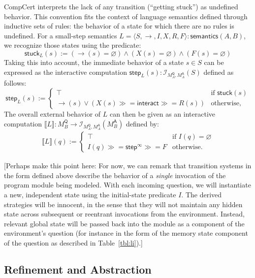 \documentclass{article}
\newcommand{\kw}[1]{\ensuremath{ \mathsf{#1} }}
\newcommand{\bind}{\gg\!\!=}
\begin{document}
CompCert interprets the lack of any transition (``getting stuck'')
as undefined behavior.
This convention fits the context of
language semantics defined through inductive sets of rules:
the behavior of a state for which there are no rules is undefined.
For a small-step semantics
$L = \langle S, {\rightarrow}, I, X, R, F \rangle : \kw{semantics}(A,B)$,
we recognize those states using the predicate:
\[
    \kw{stuck}_L(s) :=
      ({\rightarrow}(s) = \varnothing) \wedge
      (X(s) = \varnothing) \wedge
      (F(s) = \varnothing)
\]
Taking this into account,
the immediate behavior of a state $s \in S$
can be expressed as the interactive computation
$\kw{step}_L(s) : \mathcal{I}_{M_A^\kw{Q},M_A^\kw{A}}(S)$
defined as follows:
\[
  \kw{step}_L(s) :=
    \begin{cases}
      \top & \mbox{if } \kw{stuck}(s) \\
      {\rightarrow}(s) \vee
      (X(s) \bind \kw{interact} \bind R(s)) & \mbox{otherwise,}
   \end{cases}
\]
The overall external behavior of $L$
can then be given as an interactive computation
$
    \llbracket L \rrbracket :
      M_B^\kw{Q} \rightarrow \mathcal{I}_{M_A^\kw{Q},M_A^\kw{A}}(M_B^\kw{A})
$
defined by:
\begin{align*}
  \llbracket L \rrbracket (q) :=
    \begin{cases}
       \top & \mbox{if } I(q) = \varnothing \\
       I(q) \bind \kw{step}^\infty \bind F & \mbox{otherwise.}
     \end{cases}
\end{align*}

[Perhaps make this point here:
For now,
we can remark that transition systems in the form defined above
describe the behavior of a \emph{single} invocation
of the program module being modeled.
With each incoming question,
we will instantiate a new, independent state
using the initial-state predicate $I$.
The derived strategies will be innocent,
in the sense that they will not maintain
any hidden state across subsequent or reentrant
invocations from the environment.
Instead,
relevant global state will be passed back into the module
as a component of the environment's question
(for instance in the form of the memory state component
of the question as described in Table~\ref{tbl:li}).]


\subsection{Refinement and Abstraction} %
\label{sec:modsem:ref}
\end{document}
